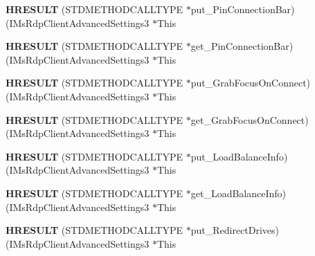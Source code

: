 \begin{DoxyCompactItemize}
{\bfseries H\+R\+E\+S\+U\+LT} (S\+T\+D\+M\+E\+T\+H\+O\+D\+C\+A\+L\+L\+T\+Y\+PE $\ast$put\+\_\+\+Pin\+Connection\+Bar)(I\+Ms\+Rdp\+Client\+Advanced\+Settings3 $\ast$This
\item 
\mbox{\label{struct_i_ms_rdp_client_advanced_settings3_vtbl_ad03770cf4b5f5e0b9c43ab8ca924eb63}} 
{\bfseries H\+R\+E\+S\+U\+LT} (S\+T\+D\+M\+E\+T\+H\+O\+D\+C\+A\+L\+L\+T\+Y\+PE $\ast$get\+\_\+\+Pin\+Connection\+Bar)(I\+Ms\+Rdp\+Client\+Advanced\+Settings3 $\ast$This
\item 
\mbox{\label{struct_i_ms_rdp_client_advanced_settings3_vtbl_aeca9b6893d2cbebf02e3e1a84ea523c4}} 
{\bfseries H\+R\+E\+S\+U\+LT} (S\+T\+D\+M\+E\+T\+H\+O\+D\+C\+A\+L\+L\+T\+Y\+PE $\ast$put\+\_\+\+Grab\+Focus\+On\+Connect)(I\+Ms\+Rdp\+Client\+Advanced\+Settings3 $\ast$This
\item 
\mbox{\label{struct_i_ms_rdp_client_advanced_settings3_vtbl_a20e2fd1c632a48036a5175acb0937412}} 
{\bfseries H\+R\+E\+S\+U\+LT} (S\+T\+D\+M\+E\+T\+H\+O\+D\+C\+A\+L\+L\+T\+Y\+PE $\ast$get\+\_\+\+Grab\+Focus\+On\+Connect)(I\+Ms\+Rdp\+Client\+Advanced\+Settings3 $\ast$This
\item 
\mbox{\label{struct_i_ms_rdp_client_advanced_settings3_vtbl_a23c3a13eb7321c165bd9c2633c1b25a3}} 
{\bfseries H\+R\+E\+S\+U\+LT} (S\+T\+D\+M\+E\+T\+H\+O\+D\+C\+A\+L\+L\+T\+Y\+PE $\ast$put\+\_\+\+Load\+Balance\+Info)(I\+Ms\+Rdp\+Client\+Advanced\+Settings3 $\ast$This
\item 
\mbox{\label{struct_i_ms_rdp_client_advanced_settings3_vtbl_ad3108baa80c4e2de9ac4ae6e0bac787f}} 
{\bfseries H\+R\+E\+S\+U\+LT} (S\+T\+D\+M\+E\+T\+H\+O\+D\+C\+A\+L\+L\+T\+Y\+PE $\ast$get\+\_\+\+Load\+Balance\+Info)(I\+Ms\+Rdp\+Client\+Advanced\+Settings3 $\ast$This
\item 
\mbox{\label{struct_i_ms_rdp_client_advanced_settings3_vtbl_ad110739f6fad44afaf62b73d43e955b2}} 
{\bfseries H\+R\+E\+S\+U\+LT} (S\+T\+D\+M\+E\+T\+H\+O\+D\+C\+A\+L\+L\+T\+Y\+PE $\ast$put\+\_\+\+Redirect\+Drives)(I\+Ms\+Rdp\+Client\+Advanced\+Settings3 $\ast$This

\end{DoxyCompactItemize}
